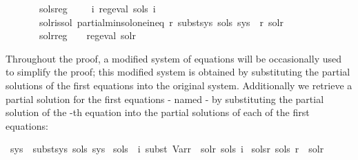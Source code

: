 \begin{isabellebody}
\ \ \ \ \ \ \ sols{\isacharunderscore}{\kern0pt}reg{\isacharcolon}{\kern0pt}\ \ \ \ \ {\isachardoublequoteopen}{\isasymforall}i{\isachardot}{\kern0pt}\ reg{\isacharunderscore}{\kern0pt}eval\ {\isacharparenleft}{\kern0pt}sols\ i{\isacharparenright}{\kern0pt}{\isachardoublequoteclose}\isanewline
\ \ \ \ \ \ \ sol{\isacharunderscore}{\kern0pt}r{\isacharunderscore}{\kern0pt}is{\isacharunderscore}{\kern0pt}sol{\isacharcolon}{\kern0pt}\ {\isachardoublequoteopen}partial{\isacharunderscore}{\kern0pt}min{\isacharunderscore}{\kern0pt}sol{\isacharunderscore}{\kern0pt}one{\isacharunderscore}{\kern0pt}ineq\ r\ {\isacharparenleft}{\kern0pt}subst{\isacharunderscore}{\kern0pt}sys\ sols\ sys\ {\isacharbang}{\kern0pt}\ r{\isacharparenright}{\kern0pt}\ sol{\isacharunderscore}{\kern0pt}r{\isachardoublequoteclose}\isanewline
\ \ \ \ \ \ \ sol{\isacharunderscore}{\kern0pt}r{\isacharunderscore}{\kern0pt}reg{\isacharcolon}{\kern0pt}\ \ \ \ {\isachardoublequoteopen}reg{\isacharunderscore}{\kern0pt}eval\ sol{\isacharunderscore}{\kern0pt}r{\isachardoublequoteclose}\isanewline
{}%
\begin{isamarkuptext}%
Throughout the proof, a modified system of equations will be occasionally used to simplify
the proof; this modified system is obtained by substituting the partial solutions of
the first  equations into the original system. Additionally
we retrieve a partial solution for the first  equations - named  - by substituting the partial
solution of the -th equation into the partial solutions of each of the first  equations:%
\end{isamarkuptext}\isamarkuptrue%
\isamarkupfalse%
\ {\isachardoublequoteopen}sys{\isacharprime}{\kern0pt}\ {\isasymequiv}\ subst{\isacharunderscore}{\kern0pt}sys\ sols\ sys{\isachardoublequoteclose}\isanewline
{}\isamarkupfalse%
\ {\isachardoublequoteopen}sols{\isacharprime}{\kern0pt}\ {\isasymequiv}\ {\isasymlambda}i{\isachardot}{\kern0pt}\ subst\ {\isacharparenleft}{\kern0pt}Var{\isacharparenleft}{\kern0pt}r\ {\isacharcolon}{\kern0pt}{\isacharequal}{\kern0pt}\ sol{\isacharunderscore}{\kern0pt}r{\isacharparenright}{\kern0pt}{\isacharparenright}{\kern0pt}\ {\isacharparenleft}{\kern0pt}sols\ i{\isacharparenright}{\kern0pt}{\isachardoublequoteclose}\isanewline
\isanewline
{}\isamarkupfalse%
\ sols{\isacharprime}{\kern0pt}{\isacharunderscore}{\kern0pt}r{\isacharcolon}{\kern0pt}\ {\isachardoublequoteopen}sols{\isacharprime}{\kern0pt}\ r\ {\isacharequal}{\kern0pt}\ sol{\isacharunderscore}{\kern0pt}r{\isachardoublequoteclose}\isanewline

\end{isabellebody}
